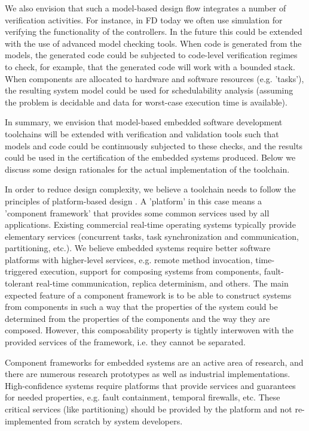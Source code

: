 We also envision that such a model-based design flow integrates a number of verification activities. For instance, in FD today we often use simulation for verifying the functionality of the controllers. In the future this could be extended with the use of advanced model checking tools. When code is generated from the models, the generated code could be subjected to code-level verification regimes to check, for example, that the generated code will work with a bounded stack. When components are allocated to hardware and software resources (e.g. 'tasks'), the resulting system model could be used for schedulability analysis (assuming the problem is decidable and data for worst-case execution time is available).

In summary, we envision that model-based embedded software development toolchains will be extended with verification and validation tools such that models and code could be continuously subjected to these checks, and the results could be used in the certification of the embedded systems produced. Below we discuss some design rationales for the actual implementation of the toolchain.

In order to reduce design complexity, we believe a toolchain needs to follow the principles of platform-based design \cite{alberto:2002}.  A 'platform' in this case means a 'component framework' that provides some common services used by all applications. Existing commercial real-time operating systems typically provide elementary services (concurrent tasks, task synchronization and communication, partitioning, etc.). We believe embedded systems require better software platforms with higher-level services, e.g. remote method invocation, time-triggered execution, support for composing systems from components, fault-tolerant real-time communication, replica determinism, and others. The main expected feature of a component framework is to be able to construct systems from components in such a way that the properties of the system  could be determined from the properties of the components and the way they are composed. However, this composability property is tightly interwoven with the provided services of the framework, i.e. they cannot be separated.

Component frameworks for embedded systems are an active area of research, and there are numerous research prototypes as well as industrial implementations. High-confidence systems require platforms that provide services and guarantees for needed properties, e.g. fault containment, temporal firewalls, etc. These critical services (like partitioning) should be provided by the platform and not re-implemented from scratch by system developers.


